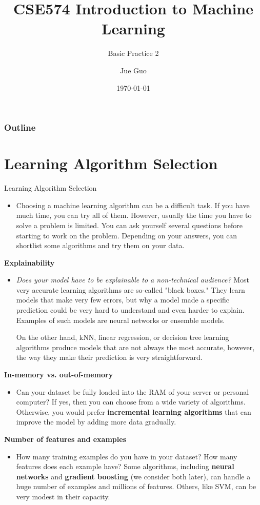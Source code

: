 \documentclass[8pt,dvipsnames]{beamer}
\title{CSE574 Introduction to Machine Learning}
\subtitle{Basic Practice 2}
\author{Jue Guo}
\institute{University at Buffalo}
\date{\today}
\begin{document}
\begin{frame}
	\titlepage
\end{frame}
\begin{frame}
	\frametitle{Outline}
	\tableofcontents
\end{frame}
\section{Learning Algorithm Selection}
\begin{frame}{Learning Algorithm Selection}
	\begin{itemize}
		\item Choosing a machine learning algorithm can be a difficult task. If you have much time, you can try all of them. However, usually the time you have to solve a problem is limited. You can ask yourself several questions before starting to work on the problem. Depending on your answers, you can shortlist some algorithms and try them on your data.
	\end{itemize}
\end{frame}

\begin{frame}
	\textbf{Explainability}
	\begin{itemize}
		\item \textit{Does your model have to be explainable to a non-technical audience? }Most very accurate learning algorithms are so-called "black boxes." They learn models that make very few errors, but why a model made a specific prediction could be very hard to understand and even harder to explain. Examples of such models are neural networks or ensemble models.

		      On the other hand, kNN, linear regression, or decision tree learning algorithms produce models that are not always the most accurate, however, the way they make their prediction is very straightforward.
	\end{itemize}
\end{frame}

\begin{frame}
	\textbf{In-memory vs. out-of-memory}
	\begin{itemize}
		\item Can your dataset be fully loaded into the RAM of your server or personal computer? If yes, then you can choose from a wide variety of algorithms. Otherwise, you would prefer \textbf{incremental learning algorithms} that can improve the model by adding more data gradually.
	\end{itemize}
	\textbf{Number of features and examples}
	\begin{itemize}
		\item How many training examples do you have in your dataset? How many features does each example have? Some algorithms, including \textbf{neural networks} and \textbf{gradient boosting} (we consider both later), can handle a huge number of examples and millions of features. Others, like SVM, can be very modest in their capacity.
	\end{itemize}
\end{frame}
\end{document}
